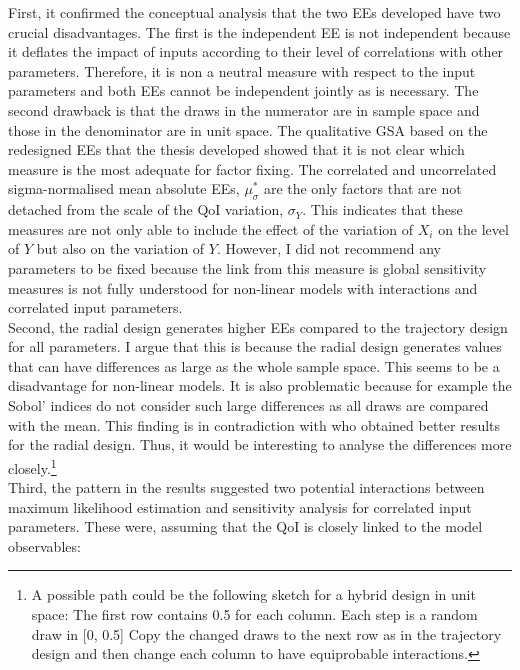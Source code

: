 First, it confirmed the conceptual analysis that the two EEs developed have \cite{ge2017extending} two crucial disadvantages. The first is the independent EE is not independent because it deflates the impact of inputs according to their level of correlations with other parameters. Therefore, it is non a neutral measure with respect to the input parameters and both EEs cannot be independent jointly as is necessary. The second drawback is that the draws in the numerator are in sample space and those in the denominator are in unit space. The qualitative GSA based on the redesigned EEs that the thesis developed showed that it is not clear which measure is the most adequate for factor fixing. The correlated and uncorrelated sigma-normalised mean absolute EEs, $\mu_\sigma^*$ are the only factors that are not detached from the scale of the QoI variation, $\sigma_Y$. This indicates that these measures are not only able to include the effect of the variation of $X_i$ on the level of $Y$ but also on the variation of $Y$. However, I did not recommend any parameters to be fixed because the link from this measure is global sensitivity measures is not fully understood for non-linear models with interactions and correlated input parameters.\\

\noindent
Second, the radial design generates higher EEs compared to the trajectory design for all parameters. I argue that this is because the radial design generates values that can have differences as large as the whole sample space. This seems to be a disadvantage for non-linear models. It is also problematic because for example the Sobol' indices do not consider such large differences as all draws are compared with the mean. This finding is in contradiction with \cite{campolongo2007effective} who obtained better results for the radial design. Thus, it would be interesting to analyse the differences more closely.\footnote{A possible path could be the following sketch for a hybrid design in unit space: The first row contains 0.5 for each column. Each step is a random draw in [0, 0.5] Copy the changed draws to the next row as in the trajectory design and then change each column to have equiprobable interactions.}\\

\noindent
Third, the pattern in the results suggested two potential interactions between maximum likelihood estimation and sensitivity analysis for correlated input parameters. These were, assuming that the QoI is closely linked to the model observables:

